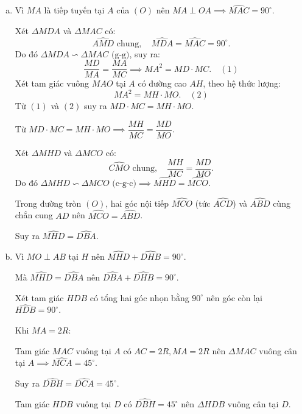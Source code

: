 \begin{bt}
{\begin{enumerate}[a)]
			Vì $MA, MB$ là hai tiếp tuyến cắt nhau của $(O)$ nên $MA = MB$ và $OA = OB = R$, suy ra $MO$ là đường trung trực của $AB \implies MO \perp AB$ tại $H \implies \widehat{MHA} = 90^\circ$.
			
			Tứ giác $MDHA$ có $\widehat{ADM} = \widehat{MHA} = 90^\circ$, do đó hai đỉnh kề nhau $D$ và $H$ cùng nhìn đoạn $MA$ dưới góc vuông.
			
			Suy ra tứ giác $MDHA$ nội tiếp đường tròn đường kính $MA$.
			\item Vì $MA$ là tiếp tuyến tại $A$ của $(O)$ nên $MA \perp OA \implies \widehat{MAC} = 90^\circ$.
			
			Xét $\Delta MDA$ và $\Delta MAC$ có:
			$$\widehat{AMD}\text{ chung},\quad \widehat{MDA} = \widehat{MAC} = 90^\circ.$$
			Do đó $\Delta MDA \backsim \Delta MAC\text{ (g-g)}$, suy ra:
			$$\dfrac{MD}{MA} = \dfrac{MA}{MC} \implies MA^2 = MD \cdot MC. \quad (1)$$
			Xét tam giác vuông $MAO$ tại $A$ có đường cao $AH$, theo hệ thức lượng:
			$$MA^2 = MH \cdot MO. \quad (2)$$
			Từ $(1)$ và $(2)$ suy ra $MD \cdot MC = MH \cdot MO$.
			
			Từ $MD \cdot MC = MH \cdot MO \implies \dfrac{MH}{MC} = \dfrac{MD}{MO}$.
			
			Xét $\Delta MHD$ và $\Delta MCO$ có:
			$$\widehat{CMO}\text{ chung},\quad \dfrac{MH}{MC} = \dfrac{MD}{MO}.$$
			Do đó $\Delta MHD \backsim \Delta MCO\text{ (c-g-c)} \implies \widehat{MHD} = \widehat{MCO}$.
			
			Trong đường tròn $(O)$, hai góc nội tiếp $\widehat{MCO}$ (tức $\widehat{ACD}$) và $\widehat{ABD}$ cùng chắn cung $AD$ nên $\widehat{MCO} = \widehat{ABD}$.
			
			Suy ra $\widehat{MHD} = \widehat{DBA}$.
			\item Vì $MO \perp AB$ tại $H$ nên $\widehat{MHD} + \widehat{DHB} = 90^\circ$.
			
			Mà $\widehat{MHD} = \widehat{DBA}$ nên $\widehat{DBA} + \widehat{DHB} = 90^\circ$.
			
			Xét tam giác $HDB$ có tổng hai góc nhọn bằng $90^\circ$ nên góc còn lại $\widehat{HDB} = 90^\circ$.
			
			Khi $MA = 2R$:
			
			Tam giác $MAC$ vuông tại $A$ có $AC = 2R, MA = 2R$ nên $\Delta MAC$ vuông cân tại $A \implies \widehat{MCA} = 45^\circ$.
			
			Suy ra $\widehat{DBH} = \widehat{DCA} = 45^\circ$.
			
			Tam giác $HDB$ vuông tại $D$ có $\widehat{DBH} = 45^\circ$ nên $\Delta HDB$ vuông cân tại $D$.
			

\end{enumerate}}
\end{bt}
